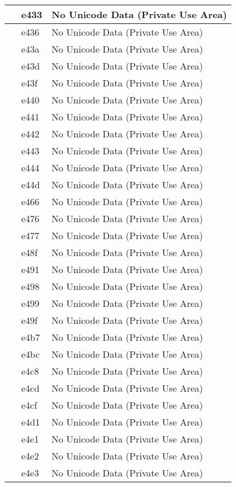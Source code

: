 \documentclass[12pt,letterpaper,openany]{book}
\begin{document}
\begin{center}
\begin{supertabular}{|m{0.25in}|m{0.5in}|m{4in}|}
 & e433 & No Unicode Data (Private Use Area)\\\hline
 & e436 & No Unicode Data (Private Use Area)\\\hline
 & e43a & No Unicode Data (Private Use Area)\\\hline
 & e43d & No Unicode Data (Private Use Area)\\\hline
 & e43f & No Unicode Data (Private Use Area)\\\hline
 & e440 & No Unicode Data (Private Use Area)\\\hline
 & e441 & No Unicode Data (Private Use Area)\\\hline
 & e442 & No Unicode Data (Private Use Area)\\\hline
 & e443 & No Unicode Data (Private Use Area)\\\hline
 & e444 & No Unicode Data (Private Use Area)\\\hline
 & e44d & No Unicode Data (Private Use Area)\\\hline
 & e466 & No Unicode Data (Private Use Area)\\\hline
 & e476 & No Unicode Data (Private Use Area)\\\hline
 & e477 & No Unicode Data (Private Use Area)\\\hline
 & e48f & No Unicode Data (Private Use Area)\\\hline
 & e491 & No Unicode Data (Private Use Area)\\\hline
 & e498 & No Unicode Data (Private Use Area)\\\hline
 & e499 & No Unicode Data (Private Use Area)\\\hline
 & e49f & No Unicode Data (Private Use Area)\\\hline
 & e4b7 & No Unicode Data (Private Use Area)\\\hline
 & e4bc & No Unicode Data (Private Use Area)\\\hline
 & e4c8 & No Unicode Data (Private Use Area)\\\hline
 & e4cd & No Unicode Data (Private Use Area)\\\hline
 & e4cf & No Unicode Data (Private Use Area)\\\hline
 & e4d1 & No Unicode Data (Private Use Area)\\\hline
 & e4e1 & No Unicode Data (Private Use Area)\\\hline
 & e4e2 & No Unicode Data (Private Use Area)\\\hline
 & e4e3 & No Unicode Data (Private Use Area)\\\hline

\end{supertabular}
\end{center}
\end{document}
